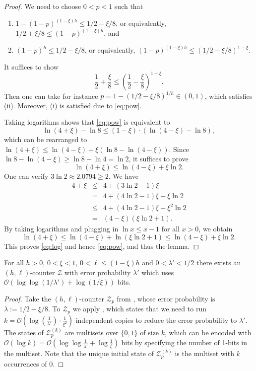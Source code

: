 \documentclass{theoretics}
\renewcommand{\O}{\mathcal{O}}
\newcommand{\BZ}{\mathcal{Z}}
\renewcommand{\geq}{\geqslant}
\renewcommand{\leq}{\leqslant}
\renewcommand{\ge}{\geq}
\renewcommand{\le}{\leq}
\begin{document}
\begin{proof}
We need to choose $0<p<1$ such that
\begin{enumerate}[label=(\roman*)]
\item $1-(1-p)^{(1-\xi) h} \le 1/2-\xi/8$, or equivalently, $1/2+\xi/8 \le (1-p)^{(1-\xi)h}$, and
\item $(1-p)^{h} \le 1/2-\xi/8$, or  equivalently, $(1-p)^{(1-\xi)h} \le (1/2-\xi/8)^{1-\xi}$.
\end{enumerate}
It suffices to show
\begin{equation}
\label{eq:pow}
\frac{1}{2}+\frac{\xi}{8} \le \left( \frac{1}{2}-\frac{\xi}{8} \right)^{1-\xi}.
\end{equation}
Then one can take for instance $p = 1-(1/2-\xi/8)^{1/h} \in (0,1)$, which satisfies (ii). Moreover, (i) is satisfied due to \eqref{eq:pow}.

Taking logarithms shows that \eqref{eq:pow} is equivalent to 
\[ 
\ln(4+\xi) - \ln 8 \le (1-\xi) \cdot (\ln(4-\xi) - \ln 8),\] 
which can be rearranged to $\ln(4+\xi) \le \ln(4-\xi) + \xi (\ln 8 - \ln(4-\xi))$. Since $\ln 8 - \ln(4-\xi) \ge \ln 8 - \ln 4 = \ln 2$, it suffices to prove
\begin{equation}
	\label{eq:log}
	\ln(4+\xi) \le \ln(4-\xi) + \xi \ln 2.
\end{equation}
One can verify $3\ln 2 \approx 2.0794 \ge 2$. We have
\begin{eqnarray*}
	4+\xi &\le& 4 + (3\ln 2 - 1) \xi \\
	&=& 4 + (4\ln 2 - 1) \xi - \xi \ln 2 \\
	&\le& 4 + (4\ln 2 - 1) \xi - \xi^2 \ln 2 \\
	&=& (4-\xi)(\xi \ln 2 + 1).
\end{eqnarray*}
By taking logarithms and plugging in $\ln x \le x-1$ for all $x > 0$, we obtain
\[
	\ln(4+\xi) \le \ln(4-\xi) + \ln(\xi \ln 2 + 1) \le \ln(4-\xi) + \xi \ln 2.
\]
This proves \eqref{eq:log} and hence \eqref{eq:pow}, and thus the lemma.
\end{proof}

\begin{proposition}
\label{prop:bernoulli}
For all $h>0$, $0 < \xi < 1$, $0 < \ell \le (1-\xi) h$ and $0 < \lambda' < 1/2$ 
there exists an $(h,\ell)$-counter $\BZ$ with error probability $\lambda'$
which uses $\O(\log \log (1/\lambda') + \log (1/\xi))$ bits.
\end{proposition}

\begin{proof}
Take the $(h,\ell)$-counter $\BZ_p$ from , whose error
probability is $\lambda := 1/2 - \xi/8$. To $\BZ_p$  we apply 
,
which states that we need to run $k = \O(\log (\frac{1}{\lambda'}) \cdot \frac{1}{\xi^2})$ independent copies
to reduce the error probability to $\lambda'$.
The states of $\BZ^{(k)}_p$ are multisets over $\{0,1\}$ of size $k$,
which can be encoded with $\O(\log k) = \O(\log \log \frac{1}{\lambda'} + \log \frac{1}{\xi})$ bits
by specifying the number of 1-bits in the multiset. Note that the unique initial state of $\BZ^{(k)}_p$
is the multiset with $k$ occurrences of $0$.
\end{proof}
\end{document}

